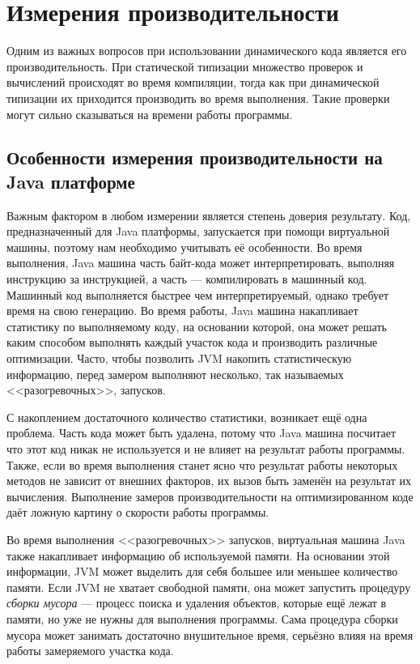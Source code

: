 \section{Измерения производительности}

Одним из важных вопросов при использовании динамического кода является его производительность. При статической типизации множество проверок и вычислений происходят во время компиляции, тогда как при динамической типизации их приходится производить во время выполнения. Такие проверки могут сильно сказываться на времени работы программы.

\subsection{Особенности измерения производительности на Java платформе}

Важным фактором в любом измерении является степень доверия результату. Код, предназначенный для Java платформы, запускается при помощи виртуальной машины, поэтому нам необходимо учитывать её особенности. Во время выполнения, Java машина часть байт-кода может интерпретировать, выполняя инструкцию за инструкцией, а часть --- компилировать в машинный код. Машинный код выполняется быстрее чем интерпретируемый, однако требует время на свою генерацию. Во время работы, Java машина накапливает статистику по выполняемому коду, на основании которой, она может решать каким способом выполнять каждый участок кода и производить различные оптимизации. Часто, чтобы позволить JVM накопить статистическую информацию, перед замером выполняют несколько, так называемых <<разогревочных>>, запусков.

С накоплением достаточного количество статистики, возникает ещё одна проблема. Часть кода может быть удалена, потому что Java машина посчитает что этот код никак не используется и не влияет на результат работы программы. Также, если во время выполнения станет ясно что результат работы некоторых методов не зависит от внешних факторов, их вызов быть заменён на результат их вычисления. Выполнение замеров производительности на оптимизированном коде даёт ложную картину о скорости работы программы.

Во время выполнения <<разогревочных>> запусков, виртуальная машина Java также накапливает информацию об используемой памяти. На основании этой информации, JVM может выделить для себя большее или меньшее количество памяти. Если JVM не хватает свободной памяти, она может запустить процедуру \textit{сборки мусора} --- процесс поиска и удаления объектов, которые ещё лежат в памяти, но уже не нужны для выполнения программы. Сама процедура сборки мусора может занимать достаточно внушительное время, серьёзно влияя на время работы замеряемого участка кода.

